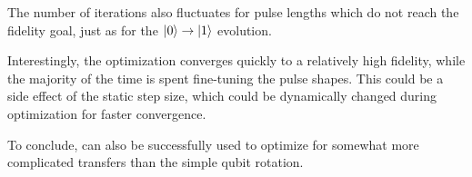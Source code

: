 \documentclass[main.tex]{subfiles}
\begin{document}
The number of iterations also fluctuates for pulse lengths which do not reach the fidelity goal, just as for the \(\ket{0}\rightarrow\ket{1}\) evolution.

Interestingly, the optimization converges quickly to a relatively high fidelity, while the majority of the time is spent fine-tuning the pulse shapes.
This could be a side effect of the static step size, which could be dynamically changed during optimization for faster convergence.

To conclude, \krotov{} can also be successfully used to optimize for somewhat more complicated transfers than the simple qubit rotation.
\end{document}
